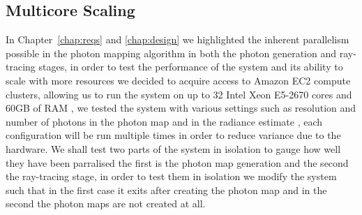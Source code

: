\subsection{Multicore Scaling}
In Chapter~\ref{chap:reqs} and \ref{chap:design} we highlighted the inherent parallelism possible in the
photon mapping algorithm in both the photon generation and ray-tracing stages, in order to
test the performance of the system and its ability to scale with more resources we decided to
acquire access to Amazon EC2 compute clusters, allowing us to run the system on up to 32 Intel
Xeon E5-2670 cores and 60GB of RAM \cite{amazon-instances}, we tested the system with various
settings such as resolution and number of photons in the photon map and in the radiance estimate
, each configuration will be run multiple times in order to reduce variance due to the hardware.
We shall test two parts of the system in isolation to gauge how well they have been parralised
the first is the photon map generation and the second the ray-tracing stage, in order to test them
in isolation we modify the system such that in the first case it exits after creating the photon
map and in the second the photon maps are not created at all.
